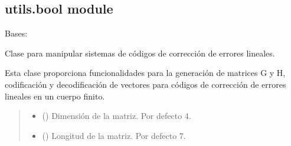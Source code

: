 \documentclass[letterpaper,10pt,english]{sphinxmanual}
\begin{document}
\subsection{utils.bool module}
\label{\detokenize{utils.bool:module-utils.bool}}\label{\detokenize{utils.bool:utils-bool-module}}\label{\detokenize{utils.bool::doc}}

\begin{fulllineitems}
\label{\detokenize{utils.bool:utils.bool.LinearSystECC}}
\pysigstartsignatures
{}
\pysigstopsignatures
\sphinxAtStartPar
Bases: 

\sphinxAtStartPar
Clase para manipular sistemas de códigos de corrección de errores lineales.

\sphinxAtStartPar
Esta clase proporciona funcionalidades para la generación de matrices G y H, codificación y decodificación de vectores para códigos de corrección de errores lineales en un cuerpo finito.
\begin{quote}\begin{description}
\begin{itemize}
\item {} 
\sphinxAtStartPar
{} (\sphinxstyleliteralemphasis{\sphinxupquote{, }}) \textendash{} Dimensión de la matriz. Por defecto 4.

\item {} 
\sphinxAtStartPar
{} (\sphinxstyleliteralemphasis{\sphinxupquote{, }}) \textendash{} Longitud de la matriz. Por defecto 7.


\end{itemize}
\end{description}
\end{quote}
\end{fulllineitems}
\end{document}
